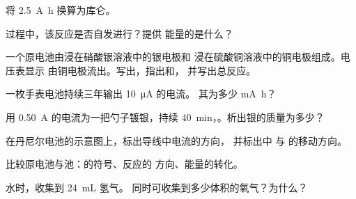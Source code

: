 \begin{exercise}[$\star$]\label{exo:g12:cells-and-electrolysis:4}
将 \qty{2.5}{A.h} 换算为库仑。
\end{exercise}

\begin{exercise}[$\star$]\label{exo:g12:cells-and-electrolysis:5}
过程中，该反应是否自发进行？提供
能量的是什么？
\end{exercise}

\begin{exercise}[$\star\star$]\label{exo:g12:cells-and-electrolysis:6}
一个原电池由浸在硝酸银溶液中的银电极和
浸在硫酸铜溶液中的铜电极组成。电压表显示
由铜电极流出。写出，指出和，
并写出总反应。
\end{exercise}

\begin{exercise}[$\star\star$]\label{exo:g12:cells-and-electrolysis:7}
一枚手表电池持续三年输出 \qty{10}{\micro A} 的电流。
其为多少 \si{mA.h}？
\end{exercise}

\begin{exercise}[$\star\star$]\label{exo:g12:cells-and-electrolysis:8}
用 \qty{0.50}{A} 的电流为一把勺子镀银，持续
\qty{40}{min}，。析出银的质量为多少？
\end{exercise}

\begin{exercise}[$\star\star$]\label{exo:g12:cells-and-electrolysis:9}
在丹尼尔电池的示意图上，标出导线中电流的方向，
并标出中  与  
的移动方向。
\end{exercise}

\begin{exercise}[$\star\star$]\label{exo:g12:cells-and-electrolysis:10}
比较原电池与池：的符号、反应的
方向、能量的转化。
\end{exercise}

\begin{exercise}[$\star\star$]\label{exo:g12:cells-and-electrolysis:11}
水时，收集到 \qty{24}{mL} 氢气。
同时可收集到多少体积的氧气？为什么？
\end{exercise}

